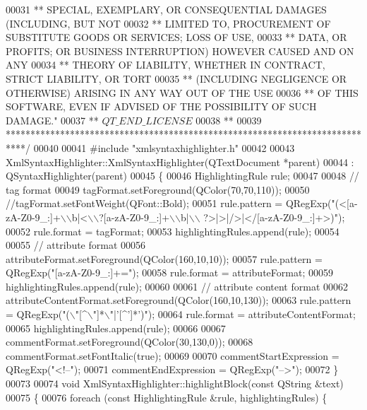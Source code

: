 \begin{DoxyCode}
00031 \textcolor{comment}{** SPECIAL, EXEMPLARY, OR CONSEQUENTIAL DAMAGES (INCLUDING, BUT NOT}
00032 \textcolor{comment}{** LIMITED TO, PROCUREMENT OF SUBSTITUTE GOODS OR SERVICES; LOSS OF USE,}
00033 \textcolor{comment}{** DATA, OR PROFITS; OR BUSINESS INTERRUPTION) HOWEVER CAUSED AND ON ANY}
00034 \textcolor{comment}{** THEORY OF LIABILITY, WHETHER IN CONTRACT, STRICT LIABILITY, OR TORT}
00035 \textcolor{comment}{** (INCLUDING NEGLIGENCE OR OTHERWISE) ARISING IN ANY WAY OUT OF THE USE}
00036 \textcolor{comment}{** OF THIS SOFTWARE, EVEN IF ADVISED OF THE POSSIBILITY OF SUCH DAMAGE."}
00037 \textcolor{comment}{** $QT\_END\_LICENSE$}
00038 \textcolor{comment}{**}
00039 \textcolor{comment}{****************************************************************************/}
00040 
00041 \textcolor{preprocessor}{#include "xmlsyntaxhighlighter.h"}
00042 
00043 XmlSyntaxHighlighter::XmlSyntaxHighlighter(QTextDocument *parent)
00044     : QSyntaxHighlighter(parent)
00045 \{
00046     HighlightingRule rule;
00047 
00048     \textcolor{comment}{// tag format}
00049     tagFormat.setForeground(QColor(70,70,110));
00050     \textcolor{comment}{//tagFormat.setFontWeight(QFont::Bold);}
00051     rule.pattern = QRegExp(\textcolor{stringliteral}{"(<[a-zA-Z0-9\_:]+\(\backslash\)\(\backslash\)b|<\(\backslash\)\(\backslash\)?[a-zA-Z0-9\_:]+\(\backslash\)\(\backslash\)b|\(\backslash\)\(\backslash\)
      ?>|>|/>|</[a-zA-Z0-9\_:]+>)"});
00052     rule.format = tagFormat;
00053     highlightingRules.append(rule);
00054 
00055     \textcolor{comment}{// attribute format}
00056     attributeFormat.setForeground(QColor(160,10,10));
00057     rule.pattern = QRegExp(\textcolor{stringliteral}{"[a-zA-Z0-9\_:]+="});
00058     rule.format = attributeFormat;
00059     highlightingRules.append(rule);
00060 
00061     \textcolor{comment}{// attribute content format}
00062     attributeContentFormat.setForeground(QColor(160,10,130));
00063     rule.pattern = QRegExp(\textcolor{stringliteral}{"(\(\backslash\)"[^\(\backslash\)"]*\(\backslash\)"|'[^']*')"});
00064     rule.format = attributeContentFormat;
00065     highlightingRules.append(rule);
00066 
00067     commentFormat.setForeground(QColor(30,130,0));
00068     commentFormat.setFontItalic(\textcolor{keyword}{true});
00069 
00070     commentStartExpression = QRegExp(\textcolor{stringliteral}{"<!--"});
00071     commentEndExpression = QRegExp(\textcolor{stringliteral}{"-->"});
00072 \}
00073 
00074 \textcolor{keywordtype}{void} XmlSyntaxHighlighter::highlightBlock(\textcolor{keyword}{const} QString &text)
00075 \{
00076      \textcolor{keywordflow}{foreach} (\textcolor{keyword}{const} HighlightingRule &rule, highlightingRules) \{

\end{DoxyCode}
